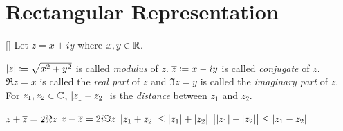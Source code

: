 \documentclass[../complex_variables_1.tex]{subfiles}
\begin{document}
\section{Rectangular Representation}

\begin{Definition}{}[]
    Let \(z = x + iy\) where \(x, y \in \RR\).
    \begin{enumerate}[label=(\roman*)]
        \ii \(\lvert z\rvert \coloneqq \sqrt{x^2+y^2}\) is called \emph{modulus} of \(z\).
        \ii \(\overline{z} \coloneqq x - iy\) is called \emph{conjugate} of \(z\).
        \ii \(\Re z = x\) is called the \emph{real part} of \(z\) and \(\Im z = y\)
        is called the \emph{imaginary part} of \(z\).
        \ii For \(z_1, z_2 \in \CC\), \(\lvert z_1 - z_2\rvert\) is the \emph{distance}
        between \(z_1\) and \(z_2\).
    \end{enumerate}
\end{Definition}

\begin{note}
    \begin{itemize}
        \ii \(z + \overline{z} = 2 \Re z\)
        \ii \(z - \overline{z} = 2i \Im z\)
        \ii \(\lvert z_1 + z_2\rvert \le \lvert z_1\rvert + \lvert z_2\rvert\)
        \ii \(\bigl|\lvert z_1\rvert - \lvert z_2\rvert\bigr| \le \lvert z_1 - z_2\rvert\)
    \end{itemize}
\end{note}
\end{document}
